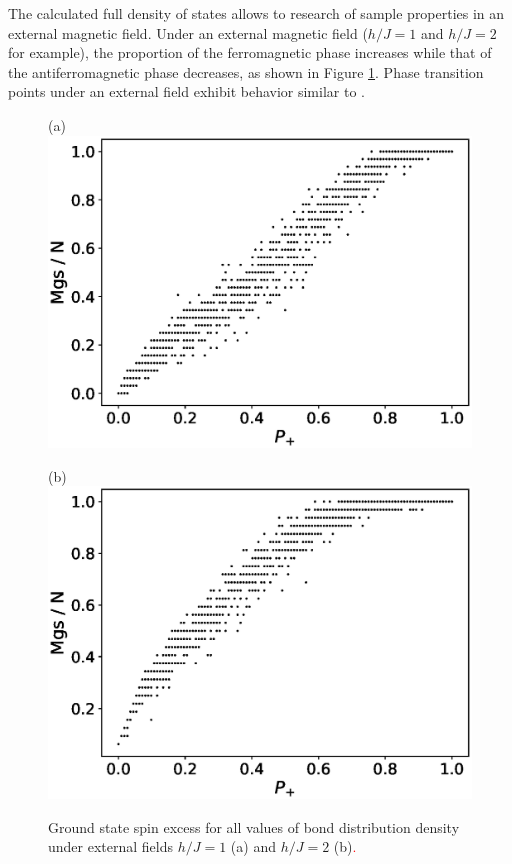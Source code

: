 \documentclass[preprint,12pt]{elsarticle}
\begin{document}
	The calculated full density of states allows to research of sample properties in an external magnetic field. Under an external magnetic field ($h/J = 1$ and $h/J = 2$ for example), the proportion of the ferromagnetic phase increases while that of the antiferromagnetic phase decreases, as shown in Figure \ref{fig:Mgs(P+)_H}. Phase transition points under an external field exhibit behavior similar to \cite{trukhin2024thermodynamic}.
	
	\begin{figure}[H]
		\begin{minipage}[h]{0.45\linewidth}
			\centering (a)
			\includegraphics[width=1\linewidth]{images/Mgs(P+)_H1.eps}
		\end{minipage}
		\hfill
		\begin{minipage}[h]{0.45\linewidth}
			\centering (b)
			\includegraphics[width=1\linewidth]{images/Mgs(P+)_H2.eps}
		\end{minipage}
		\caption{Ground state spin excess for all values of bond distribution density under external fields $h/J = 1$ (a) and $h/J = 2$ (b)\textcolor{red}{.}}
		\label{fig:Mgs(P+)_H}
	\end{figure}
	
\end{document}
